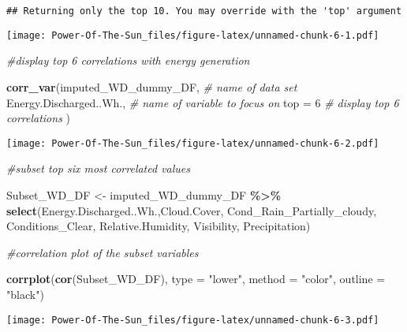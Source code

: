 \documentclass[
]{article}
\newenvironment{Shaded}{\begin{snugshade}}{\end{snugshade}}
\newcommand{\AttributeTok}[1]{\textcolor[rgb]{0.13,0.29,0.53}{#1}}
\newcommand{\CommentTok}[1]{\textcolor[rgb]{0.56,0.35,0.01}{\textit{#1}}}
\newcommand{\DecValTok}[1]{\textcolor[rgb]{0.00,0.00,0.81}{#1}}
\newcommand{\FunctionTok}[1]{\textcolor[rgb]{0.13,0.29,0.53}{\textbf{#1}}}
\newcommand{\NormalTok}[1]{#1}
\newcommand{\OtherTok}[1]{\textcolor[rgb]{0.56,0.35,0.01}{#1}}
\newcommand{\SpecialCharTok}[1]{\textcolor[rgb]{0.81,0.36,0.00}{\textbf{#1}}}
\newcommand{\StringTok}[1]{\textcolor[rgb]{0.31,0.60,0.02}{#1}}
\begin{document}
\begin{verbatim}
## Returning only the top 10. You may override with the 'top' argument
\end{verbatim}

\texttt{[image: Power-Of-The-Sun\_files/figure-latex/unnamed-chunk-6-1.pdf]}

\begin{Shaded}
\begin{Highlighting}[]
\CommentTok{\#display top 6 correlations with  energy generation }

\FunctionTok{corr\_var}\NormalTok{(imputed\_WD\_dummy\_DF, }\CommentTok{\# name of data set}
\NormalTok{  Energy.Discharged..Wh., }\CommentTok{\# name of variable to focus on}
  \AttributeTok{top =} \DecValTok{6}  \CommentTok{\# display top 6 correlations}
\NormalTok{)}
\end{Highlighting}
\end{Shaded}

\texttt{[image: Power-Of-The-Sun\_files/figure-latex/unnamed-chunk-6-2.pdf]}

\begin{Shaded}
\begin{Highlighting}[]
\CommentTok{\#subset top six most correlated values }

\NormalTok{Subset\_WD\_DF }\OtherTok{\textless{}{-}}\NormalTok{ imputed\_WD\_dummy\_DF }\SpecialCharTok{\%\textgreater{}\%}
  \FunctionTok{select}\NormalTok{(Energy.Discharged..Wh.,Cloud.Cover,}
\NormalTok{         Cond\_Rain\_Partially\_cloudy,}
\NormalTok{         Conditions\_Clear, Relative.Humidity,}
\NormalTok{         Visibility, Precipitation)}

\CommentTok{\#correlation plot of the subset variables }

\FunctionTok{corrplot}\NormalTok{(}\FunctionTok{cor}\NormalTok{(Subset\_WD\_DF), }
         \AttributeTok{type =} \StringTok{"lower"}\NormalTok{,}
         \AttributeTok{method =} \StringTok{"color"}\NormalTok{,}
         \AttributeTok{outline =} \StringTok{"black"}\NormalTok{)}
\end{Highlighting}
\end{Shaded}

\texttt{[image: Power-Of-The-Sun\_files/figure-latex/unnamed-chunk-6-3.pdf]}
\end{document}
